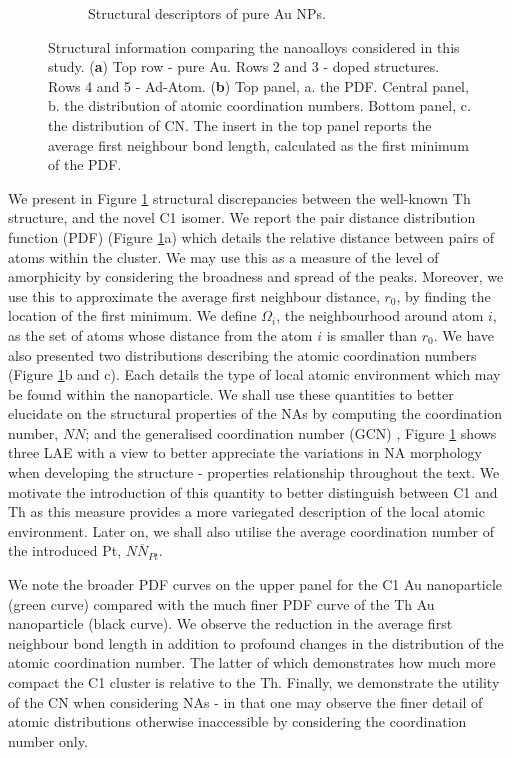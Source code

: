 \begin{figure}
\begin{subfigure}[b]{0.45\textwidth}
    \caption{Structural descriptors of pure Au NPs.}
    \label{Fig:Compare}
\end{subfigure}
\caption{Structural information comparing the nanoalloys considered in this study. (\textbf{a}) Top row - pure Au. Rows 2 and 3 - doped structures. Rows 4 and 5 - Ad-Atom. (\textbf{b}) Top panel, a. the PDF. Central panel, b. the distribution of atomic coordination numbers. Bottom panel, c. the distribution of CN. The insert in the top panel reports the average first neighbour bond length, calculated as the first minimum of the PDF.}
\label{Fig:Au20_Struts}
\end{figure}


We present in Figure \ref{Fig:Compare} structural discrepancies between the well-known Th structure, and the novel C1 isomer. We report the pair distance distribution function (PDF) (Figure \ref{Fig:Compare}a) which details the relative distance between pairs of atoms within the cluster. We may use this as a measure of the level of amorphicity by considering the broadness and spread of the peaks. Moreover, we use this to approximate the average first neighbour distance, $r_{0}$, by finding the location of the first minimum. We define $\Omega_i$, the neighbourhood around atom $i$, as the set of atoms whose distance from the atom $i$ is smaller than $r_0$. We have also presented two distributions describing the atomic coordination numbers (Figure \ref{Fig:Compare}b and c). Each details the type of local atomic environment which may be found within the nanoparticle. We shall use these quantities to better elucidate on the structural properties of the NAs by computing the coordination number, $NN$; and the generalised coordination number (GCN) \cite{ActivityGCN}, Figure \ref{Fig:Compare} shows three LAE with a view to better appreciate the variations in NA morphology when developing the structure - properties relationship throughout the text. We motivate the introduction of this quantity to better distinguish between C1 and Th as this measure provides a more variegated description of the local atomic environment. Later on, we shall also utilise the average coordination number of the introduced Pt, $\overline{NN_{Pt}}$.

We note the broader PDF curves on the upper panel for the C1 Au nanoparticle (green curve) compared with the much finer PDF curve of the Th Au nanoparticle (black curve). We observe the reduction in the average first neighbour bond length in addition to profound changes in the distribution of the atomic coordination number. The latter of which demonstrates how much more compact the C1 cluster is relative to the Th. Finally, we demonstrate the utility of the CN when considering NAs - in that one may observe the finer detail of atomic distributions otherwise inaccessible by considering the coordination number only.

